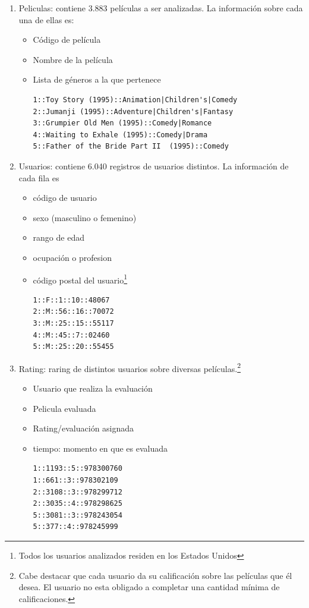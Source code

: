 \documentclass[journal]{IEEEtran}
\begin{document}
\begin{enumerate}
	\item Peliculas: contiene 3.883 películas a ser analizadas. La información sobre cada
		una de ellas es:
		\begin{itemize}
			\item Código de película
			\item Nombre de la película
			\item Lista de géneros a la que pertenece
				\begin{lstlisting}[frame=single, breaklines=true]
1::Toy Story (1995)::Animation|Children's|Comedy
2::Jumanji (1995)::Adventure|Children's|Fantasy
3::Grumpier Old Men (1995)::Comedy|Romance
4::Waiting to Exhale (1995)::Comedy|Drama
5::Father of the Bride Part II  (1995)::Comedy
				\end{lstlisting}
		\end{itemize}


	\item Usuarios: contiene 6.040 registros de usuarios distintos. La información de cada
		fila es
		\begin{itemize}
			\item código de usuario
			\item sexo (masculino o femenino)
			\item rango de edad
			\item ocupación o profesion
			\item código postal del usuario\footnote{Todos los usuarios analizados residen 
			  en los Estados Unidos}
				\begin{lstlisting}[frame=single]
1::F::1::10::48067
2::M::56::16::70072
3::M::25::15::55117
4::M::45::7::02460
5::M::25::20::55455
				\end{lstlisting}
		\end{itemize}

	\item Rating: raring de distintos usuarios sobre diversas películas.\footnote{Cabe
		destacar que cada usuario da su calificación sobre las películas que él desea. El
		usuario no esta obligado a completar una cantidad mínima de calificaciones.}

		\begin{itemize}
			\item Usuario que realiza la evaluación
			\item Pelicula evaluada
			\item Rating/evaluación asignada
			\item tiempo: momento en que es evaluada

        \begin{lstlisting}[frame=single,breaklines=true]
1::1193::5::978300760
1::661::3::978302109
2::3108::3::978299712
2::3035::4::978298625
5::3081::3::978243054
5::377::4::978245999
        \end{lstlisting}
    \end{itemize}

\end{enumerate}
\end{document}
